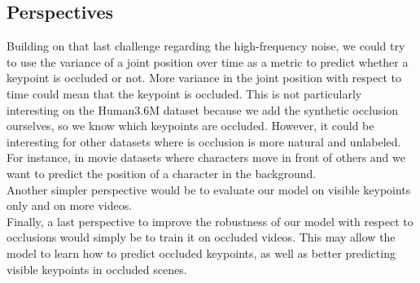 \documentclass[runningheads]{llncs}
\begin{document}
\subsection{Perspectives}
Building on that last challenge regarding the high-frequency noise, we could try to use the variance of a joint position over time as a metric to predict whether a keypoint is occluded or not. More variance in the joint position with respect to time could mean that the keypoint is occluded. This is not particularly interesting on the Human3.6M dataset because we add the synthetic occlusion ourselves, so we know which keypoints are occluded. However, it could be interesting for other datasets where is occlusion is more natural and unlabeled. For instance, in movie datasets where characters move in front of others and we want to predict the position of a character in the background. \\
Another simpler perspective would be to evaluate our model on visible keypoints only and on more videos. \\
Finally, a last perspective to improve the robustness of our model with respect to occlusions would simply be to train it on occluded videos. This may allow the model to learn how to predict occluded keypoints, as well as better predicting visible keypoints in occluded scenes.
\end{document}
